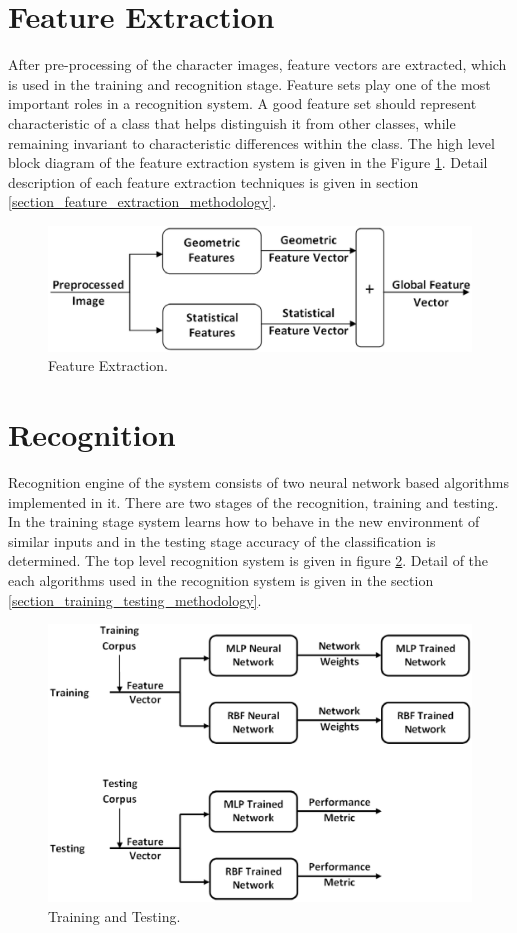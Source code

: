 \section{Feature Extraction} \label{section_feature_extraction}
After pre-processing of the character images, feature vectors are extracted, which is used in the training and recognition stage. Feature sets play one of the most important roles in a recognition system. A good feature set should represent characteristic of a class that helps distinguish it from other classes, while remaining invariant to characteristic differences within the class. The high level block diagram of the feature extraction system is given in the Figure \ref{figure_feature_extraction}. Detail description of each feature extraction techniques is given in section \ref{section_feature_extraction_methodology}.
\begin{figure}[h]
\centering
\includegraphics[width=5in]{figures/system_overview/feature_extraction.eps}
\caption{Feature Extraction.}
\label{figure_feature_extraction}
\end{figure}

\pagebreak
\section{Recognition} \label{section_recognition}
Recognition engine of the system consists of two neural network based algorithms implemented in it. There are two stages of the recognition, training and testing. In the training stage system learns how to behave in the new environment of similar inputs and in the testing stage accuracy of the classification is determined. The top level recognition system is given in figure \ref{figure_recognition}. Detail of the each algorithms used in the recognition system is given in the section \ref{section_training_testing_methodology}.


\begin{figure}[h]
\centering
\includegraphics[width=4.50in]{figures/system_overview/testing_training.eps}
\caption{Training and Testing.}
\label{figure_recognition}
\end{figure}
